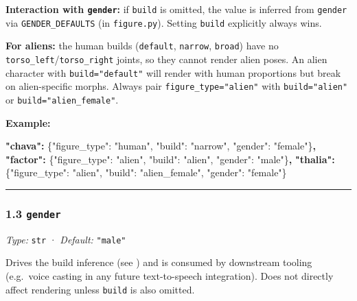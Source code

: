 \documentclass[
  12pt,
  letterpaper,
]{book}
\newenvironment{Shaded}{}{}
\newcommand{\DataTypeTok}[1]{\textcolor[rgb]{0.56,0.13,0.00}{#1}}
\newcommand{\ErrorTok}[1]{\textcolor[rgb]{1.00,0.00,0.00}{\textbf{#1}}}
\newcommand{\FunctionTok}[1]{\textcolor[rgb]{0.02,0.16,0.49}{#1}}
\newcommand{\StringTok}[1]{\textcolor[rgb]{0.25,0.44,0.63}{#1}}
\begin{document}
\textbf{Interaction with \texttt{gender}:} if \texttt{build} is omitted,
the value is inferred from \texttt{gender} via \texttt{GENDER\_DEFAULTS}
(in \texttt{figure.py}). Setting \texttt{build} explicitly always wins.

\textbf{For aliens:} the human builds (\texttt{default},
\texttt{narrow}, \texttt{broad}) have no
\texttt{torso\_left}/\texttt{torso\_right} joints, so they cannot render
alien poses. An alien character with \texttt{build="default"} will
render with human proportions but break on alien-specific morphs. Always
pair \texttt{figure\_type="alien"} with \texttt{build="alien"} or
\texttt{build="alien\_female"}.

\textbf{Example:}

\begin{Shaded}
\begin{Highlighting}[]
\ErrorTok{"chava":}  \FunctionTok{\{}\DataTypeTok{"figure\_type"}\FunctionTok{:} \StringTok{"human"}\FunctionTok{,} \DataTypeTok{"build"}\FunctionTok{:} \StringTok{"narrow"}\FunctionTok{,} \DataTypeTok{"gender"}\FunctionTok{:} \StringTok{"female"}\FunctionTok{\}}\ErrorTok{,}
\ErrorTok{"factor":} \FunctionTok{\{}\DataTypeTok{"figure\_type"}\FunctionTok{:} \StringTok{"alien"}\FunctionTok{,} \DataTypeTok{"build"}\FunctionTok{:} \StringTok{"alien"}\FunctionTok{,}  \DataTypeTok{"gender"}\FunctionTok{:} \StringTok{"male"}\FunctionTok{\}}\ErrorTok{,}
\ErrorTok{"thalia":} \FunctionTok{\{}\DataTypeTok{"figure\_type"}\FunctionTok{:} \StringTok{"alien"}\FunctionTok{,} \DataTypeTok{"build"}\FunctionTok{:} \StringTok{"alien\_female"}\FunctionTok{,} \DataTypeTok{"gender"}\FunctionTok{:} \StringTok{"female"}\FunctionTok{\}}
\end{Highlighting}
\end{Shaded}

\begin{center}\rule{0.5\linewidth}{0.5pt}\end{center}

\subsubsection{\texorpdfstring{1.3
\texttt{gender}}{1.3 gender}}\label{gender}

\emph{Type:} \texttt{str} · \emph{Default:} \texttt{"male"}

Drives the build inference (see \cite{build})
and is
consumed by downstream tooling (e.g.~voice casting in any future
text-to-speech integration). Does not directly affect rendering unless
\texttt{build} is also omitted.
\end{document}
